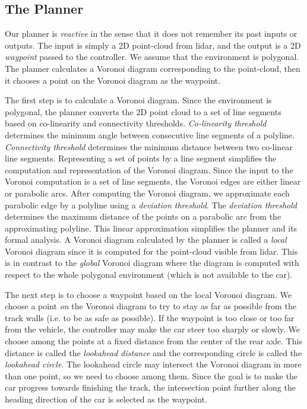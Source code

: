 \subsection{The Planner}
\label{sec:voronoiplanner}

Our planner is \emph{reactive} in the sense that it does not remember its past inputs or outputs.
The input is simply a 2D point-cloud from lidar, and the output is a 2D \emph{waypoint} passed to the controller.
We assume that the environment is polygonal.
The planner calculates a Voronoi diagram corresponding to the point-cloud, then it chooses a point on the Voronoi diagram as the waypoint.

The first step is to calculate a Voronoi diagram.
Since the environment is polygonal, the planner converts the 2D point cloud to a set of line segments based on co-linearity and connectivity thresholds.
\emph{Co-linearity threshold} determines the minimum angle between consecutive line segments of a polyline.
\emph{Connectivity threshold} determines the minimum distance between two co-linear line segments.
Representing a set of points by a line segment simplifies the computation and representation of the Voronoi diagram.
Since the input to the Voronoi computation is a set of line segments, the Voronoi edges are either linear or parabolic arcs.
After computing the Voronoi diagram, we approximate each parabolic edge by a polyline using a \emph{deviation threshold}.
The \emph{deviation threshold} determines the maximum distance of the points on a parabolic arc from the approximating polyline.
This linear approximation simplifies the planner and its formal analysis.
A Voronoi diagram calculated by the planner is called a \emph{local} Voronoi diagram since it is computed for the point-cloud visible from lidar.
This is in contrast to the \emph{global} Voronoi diagram where the diagram is computed with respect to the whole polygonal environment (which is not available to the car).

The next step is to choose a waypoint based on the local Voronoi diagram.
We choose a point \emph{on} the Voronoi diagram to try to stay as far as possible from the track walls (i.e. to be as safe as possible).
If the waypoint is too close or too far from the vehicle, the controller may make the car steer too sharply or slowly.
We choose among the points at a fixed distance from the center of the rear axle.
This distance is called the \emph{lookahead distance} and the corresponding circle is called the \emph{lookahead circle}.
The lookahead circle may intersect the Voronoi diagram in more than one point, so we need to choose among them.
Since the goal is to make the car progress towards finishing the track, the intersection point further along the heading direction of the car is selected as the waypoint.

